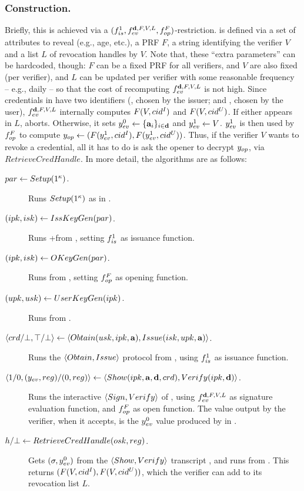 \subsubsection{\CUASRAC Construction.} %
Briefly, this is achieved via a $(f_{is}^1,f_{ev}^{\mathbf{d},F,V,L},
f_{op}^{F})$-\CUASGenInt restriction. \feval is defined via a set of
attributes \dattrs to reveal (e.g., age, etc.), a PRF $F$, a string identifying
the verifier $V$ and a list $L$ of revocation handles by $V$. Note that,
these ``extra parameters'' can be hardcoded, though: $F$ can be a fixed PRF for
all verifiers, \dattrs and $V$ are also fixed (per verifier), and $L$ can be
updated per verifier with some reasonable frequency -- e.g., daily -- so that
the cost of recomputing $f_{ev}^{\mathbf{d},F,V,L}$ is not high.
%
Since credentials in \CUASGenInt have two identifiers (\cidi, chosen by the
issuer; and \cidu, chosen by the user), $f_{ev}^{\mathbf{d},F,V,L}$ internally
computes $F(V,cid^I)$ and $F(V,cid^U)$. If either appears in $L$, \feval aborts.
Otherwise, it sets $y_{ev}^0 \gets \lbrace \mathbf{a}_i \rbrace_{i\in\mathbf{d}}$ and
$y_{ev}^1 \gets V$. $y_{ev}^1$ is
then used by $f_{op}^F$ to compute $y_{op} \gets (F(y_{ev}^1,cid^I),
F(y_{ev}^1,cid^U))$. Thus, if the verifier $V$ wants to revoke a credential, all
it has to do is ask the opener to decrypt $y_{op}$, via $RetrieveCredHandle$.
%
In more detail, the algorithms are as follows:

\begin{description}
\item[$par \gets Setup(1^\kappa)$.] Runs $Setup(1^\kappa)$ as in
  \CUASGenInt.
\item[$(ipk,isk) \gets IssKeyGen(par)$.] Runs \KeyGen+\ISet from
  \CUASGenInt, setting $f_{is}^1$ as issuance function.
\item[$(ipk,isk) \gets OKeyGen(par)$.] Runs \OKeyGen from \CUASGenInt,
  setting $f_{op}^F$ as opening function.
\item[$(upk,usk) \gets UserKeyGen(ipk)$.] Runs \KeyGen from \CUASGenInt.
\item[$\langle crd/\bot,\top/\bot \rangle \gets
  \langle Obtain(usk,ipk,\mathbf{a}),Issue(isk,upk,\mathbf{a}) \rangle$.]
  Runs the $\langle Obtain,Issue \rangle$ protocol from \CUASGenInt, using
  $f_{is}^1$ as issuance function.
\item[$\langle 1/0,(y_{ev},reg)/(0,reg)\rangle \gets \langle Show(ipk,
  \mathbf{a},\mathbf{d},crd),
  Verify(ipk,\mathbf{d}) \rangle$.]
  Runs the interactive $\langle Sign,Verify\rangle$ of \CUASGenInt,
  using $f_{ev}^{\mathbf{d},F,V,L}$ as signature evaluation function, and
  $f_{op}^F$ as open function. The \yeval value output by the verifier, when
  it accepts, is the $y_{ev}^0$ value produced by \Sign in \CUASGenInt.
\item[$h/\bot \gets RetrieveCredHandle(osk,reg)$.]
  Gets $(\sigma,y_{ev}^0)$ from the $\langle Show,Verify\rangle$ transcript
  \utrans, and runs \Open from \CUASGenInt. This returns $(F(V,cid^I),
  F(V,cid^U))$, which the verifier can add to its revocation list $L$.
\end{description}


